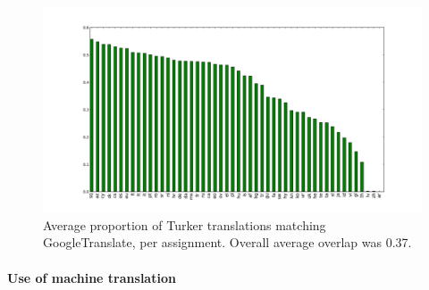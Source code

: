 \documentclass[11pt]{article}
\begin{document}
\begin{figure}[h]
\begin{center}
\includegraphics[width=1\linewidth]{../version1-figures/google_bar.png}
\caption{Average proportion of Turker translations matching GoogleTranslate, per assignment. Overall average overlap was 0.37.}
\label{googlematch} 
\end{center}
\end{figure}






\paragraph{Use of machine translation}
\end{document}
